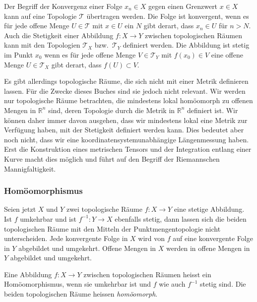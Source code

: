 Der Begriff der Konvergenz einer Folge $x_n\in X$ gegen einen Grenzwert
$x\in X$ kann auf eine Topologie $\mathscr{T}$ übertragen werden.
Die Folge ist konvergent, wenn es für jede offene Menge $U\in\mathscr{T}$
mit $x\in U$ ein $N$ gibt derart, dass $x_n\in U$ für $n>N$.
Auch die Stetigkeit einer Abbildung $f\colon X\to Y$ zwischen topologischen
Räumen kann mit den Topologien $\mathscr{T}_X$ bzw.~$\mathscr{T}_Y$
definiert werden.
Die Abbildung ist stetig im Punkt $x_0$ wenn es für jede offene Menge
$V\in \mathscr{T}_Y$ mit $f(x_0)\in V$ eine offene Menge $U\in \mathscr{T}_X$
gibt derart, dass $f(U)\subset V$.

Es gibt allerdings topologische Räume, die sich nicht mit einer
Metrik definieren lassen.
Für die Zwecke dieses Buches sind sie jedoch nicht relevant.
Wir werden nur topologische Räume betrachten, die mindestens
lokal homöomorph zu offenen Mengen in $\mathbb{R}^n$ sind, deren
Topologie durch die Metrik in $\mathbb{R}^n$ definiert ist.
Wir können daher immer davon ausgehen, dass wir mindestens lokal
eine Metrik zur Verfügung haben, mit der Stetigkeit definiert
werden kann.
Dies bedeutet aber noch nicht, dass wir eine koordinatensystemunabhängige
Längenmessung haben.
Erst die Konstruktion eines metrischen Tensors und der Integration entlang
einer Kurve macht dies möglich und führt auf den Begriff der Riemannschen
Mannigfaltigkeit.
%
%

%
%
\subsubsection{Homöomorphismus}
Seien jetzt $X$ und $Y$ zwei topologische Räume $f\colon X\to Y$ eine
stetige Abbildung.
Ist $f$ umkehrbar und ist $f^{-1}\colon Y\to X$ ebenfalls stetig, dann
lassen sich die beiden topologischen Räume mit den Mitteln der
Punktmengentopologie nicht unterscheiden.
Jede konvergente Folge in $X$ wird von $f$ auf eine konvergente Folge
in $Y$ abgebildet und umgekehrt.
Offene Mengen in $X$ werden in offene Mengen in $Y$ abgebildet und
umgekehrt.

\begin{definition}
Eine Abbildung $f\colon X\to Y$ zwischen topologischen Räumen heisst ein
Homöomorphismus, wenn sie umkehrbar ist und $f$ wie auch $f^{-1}$
stetig sind.
%
Die beiden topologischen Räume heissen {\em homöomorph}.
%
\end{definition}

